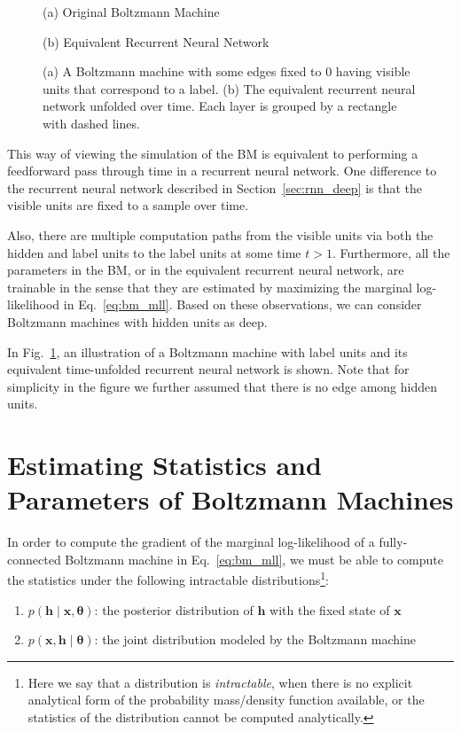 \documentclass{now}
\newcommand{\vect}[1]{\mathbf{#1}}
\newcommand{\vects}[1]{\boldsymbol{#1}}
\newcommand{\vh}[0]{\vect{h}}
\newcommand{\vx}[0]{\vect{x}}
\newcommand{\TT}[0]{{\vects{\theta}}}
\begin{document}
\begin{figure}[t]
    \vspace{2mm}
    \begin{minipage}{0.48\textwidth}
        \centering
        \small
        (a) Original Boltzmann Machine
    \end{minipage}
    \begin{minipage}{0.48\textwidth}
        \centering
        \small
        (b) Equivalent Recurrent Neural Network
    \end{minipage}
    \caption{(a) A Boltzmann machine with some edges fixed to $0$ having visible
    units that correspond to a label.  (b) The equivalent recurrent neural
network unfolded over time. Each layer is grouped by a rectangle with dashed
lines.}
    \label{fig:bm_rnn}
\end{figure}

This way of viewing the simulation of the BM is equivalent to performing a
feedforward pass through time in a recurrent neural network. One difference to
the recurrent neural network described in Section~\ref{sec:rnn_deep} is that the
visible units are fixed to a sample over time. 

Also, there are multiple computation paths from the visible units via both the
hidden and label units to the label units at some time $t > 1$. Furthermore, all
the parameters in the BM, or in the equivalent recurrent neural network, are
trainable in the sense that they are estimated by maximizing the marginal
log-likelihood in Eq.~\eqref{eq:bm_mll}. Based on these observations, we can
consider Boltzmann machines with hidden units as deep.

In Fig.~\ref{fig:bm_rnn}, an illustration of a Boltzmann machine with label
units and its equivalent time-unfolded recurrent neural network is shown. Note
that for simplicity in the figure we further assumed that there is no edge among
hidden units.


\section{Estimating Statistics and Parameters of Boltzmann Machines}
\label{sec:estimation_bm}

In order to compute the gradient of the marginal log-likelihood of a
fully-connected Boltzmann machine in Eq.~\eqref{eq:bm_mll}, we must be able to
compute the statistics under the following intractable distributions\footnote{
    Here we say that a distribution is \textit{intractable}, when there is no
explicit analytical form of the probability mass/density function available, or
the statistics of the distribution cannot be computed analytically.
}:
\begin{enumerate}
    \itemsep 0em
    \item $p(\vh \mid \vx, \TT)$: the posterior distribution of $\vh$ with the
        fixed state of $\vx$
    \item $p(\vx, \vh \mid \TT)$: the joint distribution modeled by the
        Boltzmann machine
\end{enumerate}
\end{document}

